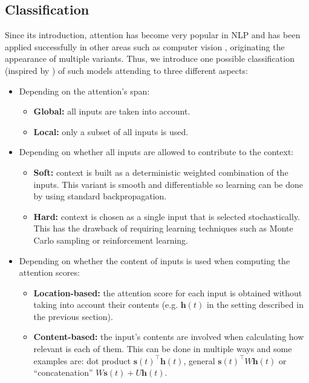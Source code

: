 \subsection{Classification}

Since its introduction, attention has become very popular in NLP and has been applied successfully in other areas such as computer vision \cite{xu2015show}, originating the appearance of multiple variants. Thus, we introduce one possible classification (inspired by \cite{luongeffective}) of such models attending to three different aspects:

\begin{itemize}
	\item  Depending on the attention's span:
		\begin{itemize}
			\itemsep 0em
			\item  \textbf{Global:} all inputs are taken into account.
			\item  \textbf{Local:} only a subset of all inputs is used.
		\end{itemize}
	\item  Depending on whether all inputs are allowed to contribute to the context:
		\begin{itemize}
			\itemsep 0em
			\item  \textbf{Soft:} context is built as a deterministic weighted combination of the inputs. This variant is smooth and differentiable so learning can be done by using standard backpropagation.
			\item  \textbf{Hard:} context is chosen as a single input that is selected stochastically. This has the drawback of requiring learning techniques such as Monte Carlo sampling or reinforcement learning.
		\end{itemize}
	\item  Depending on whether the content of inputs is used when computing the attention scores:
		\begin{itemize}
			\itemsep 0em
			\item  \textbf{Location-based:} the attention score for each input is obtained without taking into account their contents (e.g. $\mathbf{h}(t)$ in the setting described in the previous section).
			\item  \textbf{Content-based:} the input's contents are involved when calculating how relevant is each of them. This can be done in multiple ways and some examples are: dot product $\mathbf{s}(t)^{\top}\mathbf{h}(t)$, general $\mathbf{s}(t)^{\top}W\mathbf{h}(t)$ or ``concatenation'' $W\mathbf{s}(t) + U\mathbf{h}(t)$.		
		\end{itemize}	
\end{itemize}

